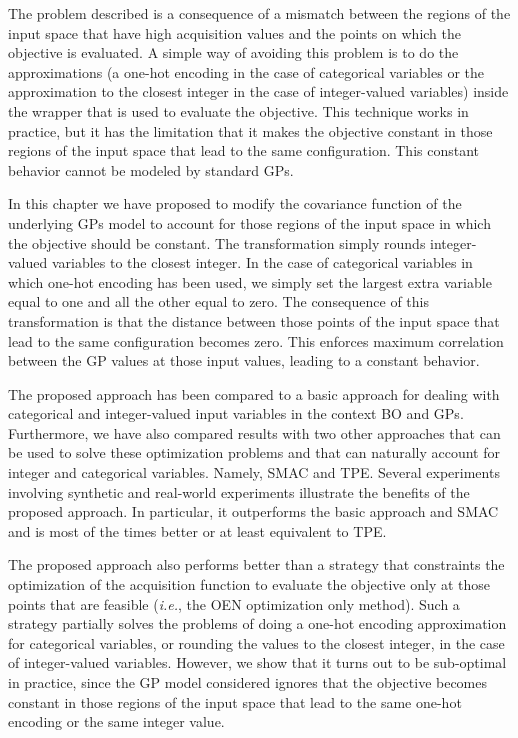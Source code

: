 The problem described is a consequence of a mismatch between the regions of the input space that have high acquisition
values and the points on which the objective is evaluated. A simple way of avoiding this problem 
is to do the approximations (a one-hot encoding in the case of categorical
variables or the approximation to the closest integer in the case of integer-valued variables) inside the
wrapper that is used to evaluate the objective. This technique works in practice, but it has the limitation
that it makes the objective constant in those regions of the input space that lead to the same configuration.
This constant behavior cannot be modeled by standard GPs.

In this chapter we have proposed to modify the covariance function of the underlying GPs model to account for
those regions of the input space in which the objective should be constant. The transformation simply 
rounds integer-valued variables to the closest integer. In the case of categorical variables in which
one-hot encoding has been used, we simply set the largest extra variable equal to one and all the other equal to zero.
The consequence of this transformation is that the distance between those points of the input space 
that lead to the same configuration becomes zero. This enforces maximum
correlation between the GP values at those input values, leading to a constant behavior.

The proposed approach has been compared to a basic approach for dealing with categorical and integer-valued
input variables in the context BO and GPs. Furthermore, we have also compared results with two other approaches 
that can be used to solve these optimization problems and that can naturally account for integer and categorical
variables. Namely, SMAC and TPE. Several experiments involving synthetic and real-world experiments illustrate the 
benefits of the proposed approach. In particular, it outperforms the basic approach and SMAC and is most of the
times better or at least equivalent to TPE. 

The proposed approach also performs better than a strategy that constraints the optimization of the 
acquisition function to evaluate the objective only at those points that are feasible (\emph{i.e.}, 
the OEN optimization only method). Such a strategy partially solves the problems of doing a one-hot 
encoding approximation for categorical variables, or rounding the values to the closest integer, in the 
case of integer-valued variables. However, we show that it turns out to be sub-optimal in practice, since
the GP model considered ignores that the objective becomes constant in those regions of the input space
that lead to the same one-hot encoding or the same integer value.
